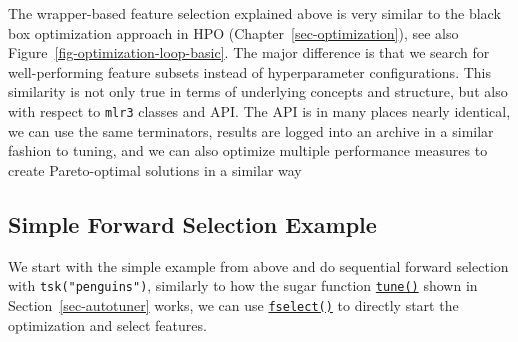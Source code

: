\begin{tcolorbox}[enhanced jigsaw, opacitybacktitle=0.6, rightrule=.15mm, opacityback=0, arc=.35mm, breakable, titlerule=0mm, colframe=quarto-callout-tip-color-frame, coltitle=black, bottomrule=.15mm, toprule=.15mm, colback=white, colbacktitle=quarto-callout-tip-color!10!white, bottomtitle=1mm, toptitle=1mm, title=\textcolor{quarto-callout-tip-color}{\faLightbulb}\hspace{0.5em}{Feature Selection and HPO}, leftrule=.75mm, left=2mm]

The wrapper-based feature selection explained above is very similar to
the black box optimization approach in HPO
(Chapter~\ref{sec-optimization}), see also
Figure~\ref{fig-optimization-loop-basic}. The major difference is that
we search for well-performing feature subsets instead of hyperparameter
configurations. This similarity is not only true in terms of underlying
concepts and structure, but also with respect to \texttt{mlr3} classes
and API. The API is in many places nearly identical, we can use the same
terminators, results are logged into an archive in a similar fashion to
tuning, and we can also optimize multiple performance measures to create
Pareto-optimal solutions in a similar way

\end{tcolorbox}

\hypertarget{sec-fs-wrapper-example}{%
\subsection{Simple Forward Selection Example}\label{sec-fs-wrapper-example}}

We start with the simple example from above and do sequential forward
selection with \texttt{tsk("penguins")}, similarly to how the sugar
function
\href{https://mlr3tuning.mlr-org.com/reference/tune.html}{\texttt{tune()}}
shown in Section~\ref{sec-autotuner} works, we can use
\href{https://mlr3fselect.mlr-org.com/reference/fselect.html}{\texttt{fselect()}}
to directly start the optimization and select features.

